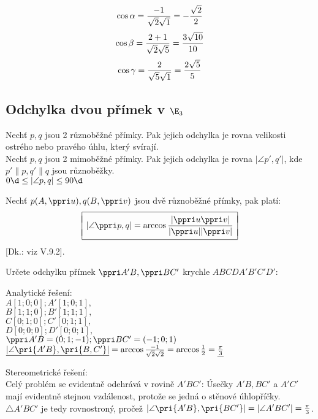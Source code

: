 $$
\cos \alpha = \f{-1}{\sqrt 2 \* \sqrt 1} = -\f{\sqrt 2}2
$$
$$
\cos \beta = \f{2+1}{\sqrt 2 \* \sqrt 5} = \f{3\sqrt {10}}{10}
$$
$$
\cos \gamma = \f{2}{\sqrt 5 \* \sqrt 1} = \f{2\sqrt 5}5
$$




\subsection{Odchylka dvou přímek v $\E_3$}
\Poz Nechť $p, q$ jsou 2 různoběžné přímky. Pak jejich odchylka je rovna velikosti ostrého nebo pravého úhlu, který svírají.\\
Nechť $p, q$ jsou 2 mimoběžné přímky. Pak jejich odchylka je rovna $|\angle p',q'|$, kde $p'\parallel p,q'\parallel q$ jsou různoběžky.\\
$0\d \le |\angle p,q| \le 90\d$

\V Nechť $p(A,\ve u),q(B,\ve v)$ jsou dvě různoběžné přímky, pak platí:
$$
\begin{array}{|c|}\hline\\[-8px]
\displaystyle	|\angle\ve p,q| = \arccos \f{|\ve u \* \ve v|}{|\ve u|\*|\ve v|}
	\\[-8px]\\\hline

\end{array}
$$
[Dk.: viz V.9.2].

\Pr Určete odchylku přímek $\ve{A'B},\ve{BC'}$ krychle $ABCDA'B'C'D'$:

\begin{minipage}{0.4\textwidth}
\end{minipage}
\begin{minipage}{0.6\textwidth}
	Analytické řešení:\\
	$A[1;0;0];A'[1;0;1],$\\
	$B[1;1;0];B'[1;1;1],$\\
	$C[0;1;0];C'[0;1;1],$\\
	$D[0;0;0];D'[0;0;1],$\\
	$\ve{A'B} = (0;1;-1); \ve{BC'}  = (-1;0;1)$\\
	$\underline{|\angle \pri{A'B},\pri{B,C'}|} = \arccos \f{-1}{\sqrt 2 \* \sqrt 2} = \arccos \f 12 = \underline{\f\pi3}$
\end{minipage}
Stereometrické řešení:\\
Celý problém se evidentně odehrává v rovině $A'BC'$:
Úsečky $A'B,BC'$ a $A'C'$ mají evidentně stejnou vzdálenost, protože se jedná o stěnové úhlopříčky. $\triangle A'BC'$ je tedy rovnostroný, pročež $|\angle \pri{A'B},\pri{BC'}| = |\angle A'BC'|= \f\pi3$.

